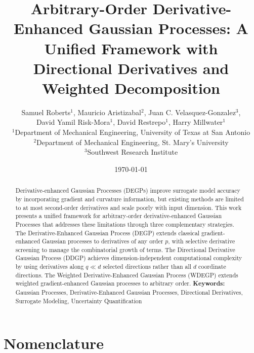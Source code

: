 \documentclass[12pt]{article}
\title{Arbitrary-Order Derivative-Enhanced Gaussian Processes: A Unified Framework with Directional Derivatives and Weighted Decomposition}
\author{
	Samuel Roberts$^{1}$, Mauricio Aristizabal$^{2}$, Juan C. Velasquez-Gonzalez$^{3}$,\\
	David Yamil Risk-Mora$^{1}$, David Restrepo$^{1}$, Harry Millwater$^{1}$\\[1em]
	$^{1}$Department of Mechanical Engineering, University of Texas at San Antonio\\
	$^{2}$Department of Mechanical Engineering, St. Mary's University\\
	$^{3}$Southwest Research Institute
}
\date{\today}
\begin{document}
	
	\maketitle
	
\begin{abstract}
	Derivative-enhanced Gaussian Processes (DEGPs) improve surrogate model accuracy by incorporating gradient and curvature information, but existing methods are limited to at most second-order derivatives and scale poorly with input dimension. This work presents a unified framework for arbitrary-order derivative-enhanced Gaussian Processes that addresses these limitations through three complementary strategies. The Derivative-Enhanced Gaussian Process (DEGP) extends classical gradient-enhanced Gaussian processes to derivatives of any order $p$, with selective derivative screening to manage the combinatorial growth of terms. The Directional Derivative Gaussian Process (DDGP) achieves dimension-independent computational complexity by using derivatives along $q \ll d$ selected directions rather than all $d$ coordinate directions. The Weighted Derivative-Enhanced Gaussian Process (WDEGP) extends weighted gradient-enhanced Gaussian processes to arbitrary order.
	\vspace{1em}
	\noindent\textbf{Keywords:} Gaussian Processes, Derivative-Enhanced Gaussian Processes, Directional Derivatives, Surrogate Modeling, Uncertainty Quantification
\end{abstract}


	
	\newpage
	\tableofcontents
	\newpage
	
	\section*{Nomenclature}
	\label{sec:nomenclature}
	
\end{document}
